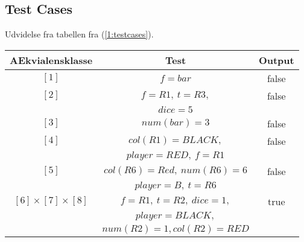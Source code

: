 \documentclass[a4paper]{article}
\begin{document}
\subsection{Test Cases}

Udvidelse fra tabellen fra (\ref{1:testcases}).

\begin{tabular}{c|c|c}
AEkvialensklasse        & Test                      & Output    \\
\toprule
$[1]$                   & $f=bar$                   & false     \\
\midrule
$[2]$                   & $f=R1,\ t=R3,$            & false     \\
                        & $dice=5$                  &           \\
\midrule
$[3]$                   & $num(bar)=3$              & false     \\
\midrule
$[4]$                   & $col(R1)=BLACK,$          & false     \\
                        & $player=RED,\ f=R1$       &           \\
\midrule
$[5]$                   & $col(R6)=Red,\ num(R6)=6$ & false     \\
                        & $player=B,\ t=R6$         &           \\
\midrule
$[6]\times[7]\times[8]$ & $f=R1,\ t=R2,\ dice=1,$   & true      \\
                        & $player=BLACK,$           &           \\
                        & $num(R2)=1,col(R2)=RED$   &           \\
\bottomrule
\end{tabular}
\end{document}
